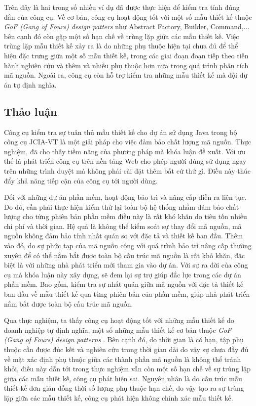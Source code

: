 \documentclass[12pt]{report}
\begin{document}
\noindent Trên đây là hai trong số nhiều ví dụ đã được thực hiện để kiểm tra tính đúng đắn của công cụ. Về cơ bản, công cụ hoạt động tốt với một số mẫu thiết kế thuộc \textit{GoF (Gang of Fours) design patters} \cite{go4} như Abstract Factory, Builder, Command,... bên cạnh đó còn gặp một số hạn chế về trùng lặp giữa các mẫu thiết kế. Việc trùng lặp mẫu thiết kế xảy ra là do những phụ thuộc hiện tại chưa đủ để thể hiện đặc trưng giữa một số mẫu thiết kế, trong các giai đoạn đoạn tiếp theo tiến hành nghiên cứu và thêm và nhiều phụ thuộc hơn nữa trong quá trình phân tích mã nguồn.
Ngoài ra, công cụ còn hỗ trợ kiểm tra những mẫu thiết kế mà đội dự án tự định nghĩa.

\subsection{Thảo luận}
Công cụ kiểm tra sự tuân thủ mẫu thiết kế cho dự án sử dụng Java trong bộ công cụ JCIA-VT là một giải pháp cho việc đảm bảo chất lượng mã nguồn. Thực nghiệm, đã cho thấy tiềm năng của phương pháp mà khóa luận đề xuất. Với ưu thế là phát triển công cụ trên nền tảng Web cho phép người dùng sử dụng ngay trên những trình duyệt mà không phải cài đặt thêm bất cứ thứ gì. Điều này thúc đẩy khả năng tiếp cận của công cụ tới người dùng.

\noindent Đối với những dự án phần mềm, hoạt động bảo trì và nâng cấp diễn ra liên tục. Do đó, cần phải thực hiện kiểm thử lại toàn bộ hệ thống nhằm đảm bảo chất lượng cho từng phiên bản phần mềm điều này là rất khó khăn do tiêu tốn nhiều chi phí và thời gian. Hệ quả là không thể kiểm soát sự thay đổi mã nguồn, mã nguồn không đảm bảo tính nhất quán so với đặc tả và thiết kế ban đầu. Thêm vào đó, do sự phức tạp của mã nguồn cộng với quá trình bảo trì nâng cấp thường xuyên để có thể nắm bắt được toàn bộ cấu trúc mã nguồn là rất khó khăn, đặc biệt là với những nhà phát triển mới tham gia vào dự án. Với sự ra đời của công cụ mà khóa luận này xây dựng, sẽ đem lại sự trợ giúp đắc lực trong các dự án phần mềm. Bao gồm, kiểm tra sự nhất quán giữa mã nguồn với đặc tả thiết kế ban đầu về mẫu thiết kế qua từng phiên bản của phần mềm, giúp nhà phát triển nắm bắt được toàn bộ cấu trúc mã nguồn.

\noindent Qua thực nghiệm, ta thấy công cụ hoạt động tốt với những mẫu thiết kế do doanh nghiệp tự định nghĩa, một số những mẫu thiết kế cơ bản thuộc \textit{GoF (Gang of Fours) design patterns} \cite{go4}. Bên cạnh đó, do thời gian là có hạn, tập phụ thuộc cần được đúc kết và nghiên cứu trong thời gian dài do vậy sự chưa đầy đủ về mặt xác định phụ thuộc giữa các thành phần mã nguồn là không thể tránh khỏi, điều này dẫn tới trong thực nghiệm vẫn còn một số hạn chế về sự trùng lặp giữa các mẫu thiết kế, công cụ phát hiện sai. Nguyên nhân là do cấu trúc mẫu thiết kế đơn giản đồng thời số lượng phụ thuộc hạn chế, do vậy tạo ra sự trùng lặp giữa các mẫu thiết kế, công cụ phát hiện không chính xác mẫu thiết kế.
\end{document}

